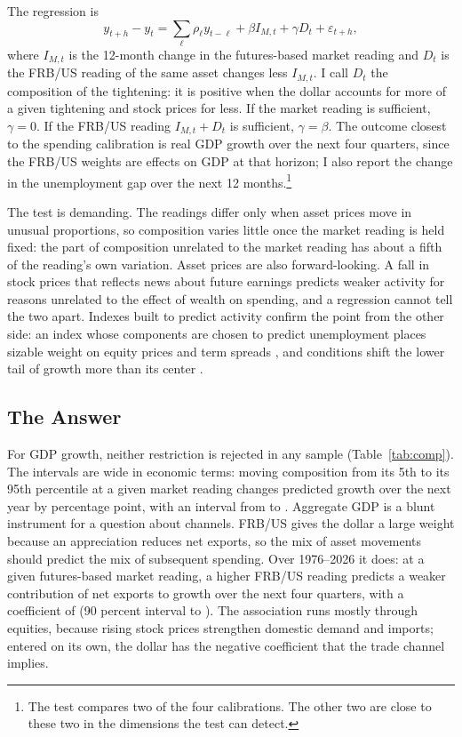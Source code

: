 \documentclass[11pt]{article}
\begin{document}
The regression is
\begin{equation}\label{eq:test}
y_{t+h}-y_t=\textstyle\sum_\ell \rho_\ell y_{t-\ell}+\beta I_{M,t}+\gamma D_t+\varepsilon_{t+h},
\end{equation}
where $I_{M,t}$ is the 12-month change in the futures-based market reading and $D_t$ is the FRB/US reading of the same asset changes less $I_{M,t}$. I call $D_t$ the composition of the tightening: it is positive when the dollar accounts for more of a given tightening and stock prices for less. If the market reading is sufficient, $\gamma=0$. If the FRB/US reading $I_{M,t}+D_t$ is sufficient, $\gamma=\beta$. The outcome closest to the spending calibration is real GDP growth over the next four quarters, since the FRB/US weights are effects on GDP at that horizon; I also report the change in the unemployment gap over the next 12 months.\footnote{The test compares two of the four calibrations. The other two are close to these two in the dimensions the test can detect.}

The test is demanding. The readings differ only when asset prices move in unusual proportions, so composition varies little once the market reading is held fixed: the part of composition unrelated to the market reading has about a fifth of the reading's own variation. Asset prices are also forward-looking. A fall in stock prices that reflects news about future earnings predicts weaker activity for reasons unrelated to the effect of wealth on spending, and a regression cannot tell the two apart. Indexes built to predict activity confirm the point from the other side: an index whose components are chosen to predict unemployment places sizable weight on equity prices and term spreads \citep{kiley2020ml}, and conditions shift the lower tail of growth more than its center \citep{adrian2019}.

\subsection{The Answer}\label{sec:answer}
For GDP growth, neither restriction is rejected in any sample (Table~\ref{tab:comp}). The intervals are wide in economic terms: moving composition from its 5th to its 95th percentile at a given market reading changes predicted growth over the next year by  percentage point, with an interval from  to . 
Aggregate GDP is a blunt instrument for a question about channels. FRB/US gives the dollar a large weight because an appreciation reduces net exports, so the mix of asset movements should predict the mix of subsequent spending. Over 1976--2026 it does: at a given futures-based market reading, a higher FRB/US reading predicts a weaker contribution of net exports to growth over the next four quarters, with a coefficient of  (90 percent interval  to ). The association runs mostly through equities, because rising stock prices strengthen domestic demand and imports; entered on its own, the dollar has the negative coefficient that the trade channel implies.
\end{document}
